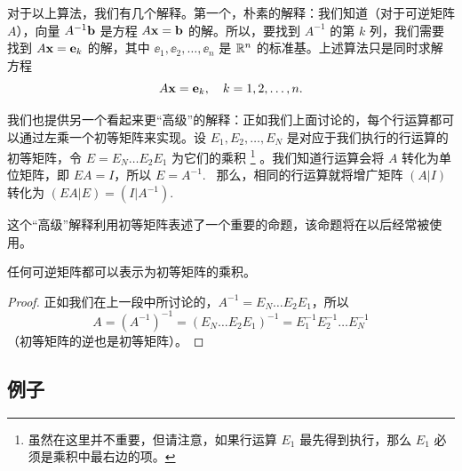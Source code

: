 对于以上算法，我们有几个解释。第一个，朴素的解释：我们知道（对于可逆矩阵 $A$），向量 $A^{-1} \mathbf{b}$ 是方程 $A \mathbf{x} = \mathbf{b}$ 的解。所以，要找到 $A^{-1}$ 的第 $k$ 列，我们需要找到 $A \mathbf{x} = \mathbf{e}_k$ 的解，其中 $\ee_1, \ee_2, \dots, \ee_n$ 是 $\mathbb{R}^n$ 的标准基。上述算法只是同时求解方程 $$A \mathbf{x} = \mathbf{e}_k, \quad k = 1, 2, \dots, n.$$

我们也提供另一个看起来更“高级”的解释：正如我们上面讨论的，每个行运算都可以通过左乘一个初等矩阵来实现。设 $E_1, E_2, \dots, E_N$ 是对应于我们执行的行运算的初等矩阵，令 $E = E_N \dots E_2 E_1$ 为它们的乘积
\footnote{
 虽然在这里并不重要，但请注意，如果行运算 $E_1$ 最先得到执行，那么 $E_1$ 必须是乘积中最右边的项。
}
。我们知道行运算会将 $A$ 转化为单位矩阵，即 $EA = I$，所以 $E = A^{-1}$. ~那么，相同的行运算就将增广矩阵 $(A | I)$ 转化为 $(EA | E) = (I | A^{-1})$. ~



这个“高级”解释利用初等矩阵表述了一个重要的命题，该命题将在以后经常被使用。

\begin{theorem}\label{stmt:02-04-01}  任何可逆矩阵都可以表示为初等矩阵的乘积。\end{theorem}

\begin{proof} 正如我们在上一段中所讨论的，$A^{-1} = E_N \dots E_2 E_1$，所以
$$A = (A^{-1})^{-1} = (E_N \dots E_2 E_1)^{-1} = E_1^{-1} E_2^{-1} \dots E_N^{-1}$$
（初等矩阵的逆也是初等矩阵）。\end{proof}

\subsection{例子}\label{sec:02-04-01}

